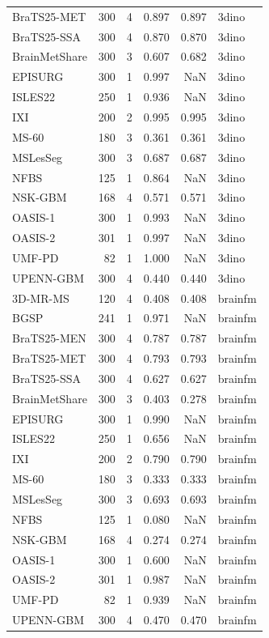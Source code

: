 \begin{tabular}{lrrrrl}
BraTS25-MET & 300 & 4 & 0.897 & 0.897 & 3dino \\
BraTS25-SSA & 300 & 4 & 0.870 & 0.870 & 3dino \\
BrainMetShare & 300 & 3 & 0.607 & 0.682 & 3dino \\
EPISURG & 300 & 1 & 0.997 & NaN & 3dino \\
ISLES22 & 250 & 1 & 0.936 & NaN & 3dino \\
IXI & 200 & 2 & 0.995 & 0.995 & 3dino \\
MS-60 & 180 & 3 & 0.361 & 0.361 & 3dino \\
MSLesSeg & 300 & 3 & 0.687 & 0.687 & 3dino \\
NFBS & 125 & 1 & 0.864 & NaN & 3dino \\
NSK-GBM & 168 & 4 & 0.571 & 0.571 & 3dino \\
OASIS-1 & 300 & 1 & 0.993 & NaN & 3dino \\
OASIS-2 & 301 & 1 & 0.997 & NaN & 3dino \\
UMF-PD & 82 & 1 & 1.000 & NaN & 3dino \\
UPENN-GBM & 300 & 4 & 0.440 & 0.440 & 3dino \\
3D-MR-MS & 120 & 4 & 0.408 & 0.408 & brainfm \\
BGSP & 241 & 1 & 0.971 & NaN & brainfm \\
BraTS25-MEN & 300 & 4 & 0.787 & 0.787 & brainfm \\
BraTS25-MET & 300 & 4 & 0.793 & 0.793 & brainfm \\
BraTS25-SSA & 300 & 4 & 0.627 & 0.627 & brainfm \\
BrainMetShare & 300 & 3 & 0.403 & 0.278 & brainfm \\
EPISURG & 300 & 1 & 0.990 & NaN & brainfm \\
ISLES22 & 250 & 1 & 0.656 & NaN & brainfm \\
IXI & 200 & 2 & 0.790 & 0.790 & brainfm \\
MS-60 & 180 & 3 & 0.333 & 0.333 & brainfm \\
MSLesSeg & 300 & 3 & 0.693 & 0.693 & brainfm \\
NFBS & 125 & 1 & 0.080 & NaN & brainfm \\
NSK-GBM & 168 & 4 & 0.274 & 0.274 & brainfm \\
OASIS-1 & 300 & 1 & 0.600 & NaN & brainfm \\
OASIS-2 & 301 & 1 & 0.987 & NaN & brainfm \\
UMF-PD & 82 & 1 & 0.939 & NaN & brainfm \\
UPENN-GBM & 300 & 4 & 0.470 & 0.470 & brainfm \\

\end{tabular}
